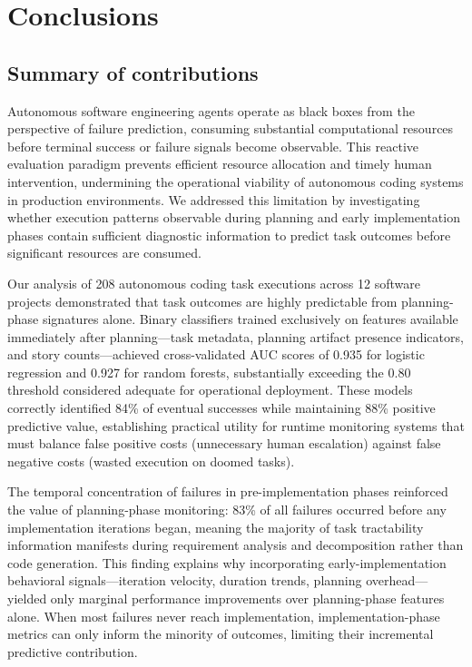 \documentclass[]{article}
\begin{document}
\section{Conclusions}
\label{sec:conclusions}
\subsection{Summary of contributions}

Autonomous software engineering agents operate as black boxes from the perspective of failure prediction, consuming substantial computational resources before terminal success or failure signals become observable. This reactive evaluation paradigm prevents efficient resource allocation and timely human intervention, undermining the operational viability of autonomous coding systems in production environments. We addressed this limitation by investigating whether execution patterns observable during planning and early implementation phases contain sufficient diagnostic information to predict task outcomes before significant resources are consumed.

Our analysis of 208 autonomous coding task executions across 12 software projects demonstrated that task outcomes are highly predictable from planning-phase signatures alone. Binary classifiers trained exclusively on features available immediately after planning—task metadata, planning artifact presence indicators, and story counts—achieved cross-validated AUC scores of 0.935 for logistic regression and 0.927 for random forests, substantially exceeding the 0.80 threshold considered adequate for operational deployment. These models correctly identified 84\% of eventual successes while maintaining 88\% positive predictive value, establishing practical utility for runtime monitoring systems that must balance false positive costs (unnecessary human escalation) against false negative costs (wasted execution on doomed tasks).

The temporal concentration of failures in pre-implementation phases reinforced the value of planning-phase monitoring: 83\% of all failures occurred before any implementation iterations began, meaning the majority of task tractability information manifests during requirement analysis and decomposition rather than code generation. This finding explains why incorporating early-implementation behavioral signals—iteration velocity, duration trends, planning overhead—yielded only marginal performance improvements over planning-phase features alone. When most failures never reach implementation, implementation-phase metrics can only inform the minority of outcomes, limiting their incremental predictive contribution.
\end{document}
